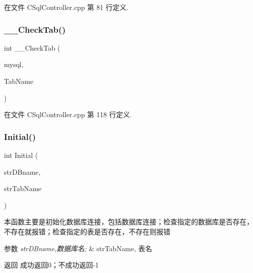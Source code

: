 在文件 C\+Sql\+Controller.\+cpp 第 81 行定义.

\mbox{\label{class_c_sql_controller_ac686b574fbd9a942df7c96902470d4f1}} 
\subsubsection{\texorpdfstring{\+\_\+\+\_\+\+Check\+Tab()}{\_\_CheckTab()}}
{\footnotesize\ttfamily int \+\_\+\+\_\+\+Check\+Tab (\begin{DoxyParamCaption}\item[{M\+Y\+S\+QL $\ast$}]{mysql,  }\item[{string}]{Tab\+Name }\end{DoxyParamCaption})\hspace{0.3cm}{\ttfamily [private]}}



在文件 C\+Sql\+Controller.\+cpp 第 118 行定义.

\mbox{\label{class_c_sql_controller_a6b36332a2db91884ebeda56a1e5bc654}} 
\subsubsection{\texorpdfstring{Initial()}{Initial()}}
{\footnotesize\ttfamily int Initial (\begin{DoxyParamCaption}\item[{string}]{str\+D\+Bname,  }\item[{string}]{str\+Tab\+Name }\end{DoxyParamCaption})}



本函数主要是初始化数据库连接，包括数据库连接；检查指定的数据库是否存在，不存在就报错；检查指定的表是否存在，不存在则报错 


\begin{DoxyParams}{参数}
{\em str\+D\+Bname,数据库名;} & str\+Tab\+Name, 表名\\
\hline
\end{DoxyParams}
\begin{DoxyReturn}{返回}
成功返回0；不成功返回-\/1 
\end{DoxyReturn}


